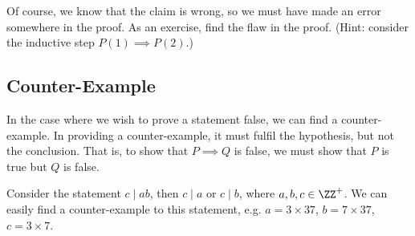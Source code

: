 Of course, we know that the claim is wrong, so we must have made an error somewhere in the proof. As an exercise, find the flaw in the proof. (Hint: consider the inductive step $P(1) \implies P(2)$.)

\subsection{Counter-Example}

In the case where we wish to prove a statement false, we can find a counter-example. In providing a counter-example, it must fulfil the hypothesis, but not the conclusion. That is, to show that $P \implies Q$ is false, we must show that $P$ is true but $Q$ is false.

\begin{example}
    Consider the statement $c \mid ab$, then $c \mid a$ or $c \mid b$, where $a, b, c \in \ZZ^+$. We can easily find a counter-example to this statement, e.g. $a = 3 \times 37$, $b = 7 \times 37$, $c = 3 \times 7$.
\end{example}